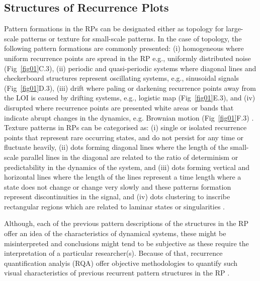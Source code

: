 \documentclass[fleqn,10pt]{wlscirep}
\begin{document}
\subsection*{Structures of Recurrence Plots}
Pattern formations in the RPs can be designated either 
as topology for large-scale patterns or texture for small-scale patterns.
In the case of topology, the following pattern formations are commonly presented:
(i) homogeneous where uniform recurrence points are spread in the RP e.g., 
uniformly distributed noise (Fig~\ref{fig01}C.3),
(ii) periodic and quasi-periodic systems where diagonal lines and 
checkerboard structures represent oscillating systems, e.g., sinusoidal 
signals (Fig~\ref{fig01}D.3),
(iii) drift where paling or darkening recurrence points away from 
the LOI is caused by drifting systems, 
e.g., logistic map (Fig~\ref{fig01}E.3), and
(iv) disrupted where recurrence points are presented white areas or 
bands that indicate abrupt changes in the dynamics, e.g. Brownian motion 
(Fig~\ref{fig01}F.3) \cite{eckmann1987, marwan2015}.
Texture patterns in RPs can be categorised as:
(i) single or isolated recurrence points that represent rare occurring states, 
and do not persist for any time or fluctuate heavily,
(ii) dots forming diagonal lines where the length of the small-scale parallel 
lines in the diagonal are related to the ratio of determinism or predictability 
in the dynamics of the system, and
(iii) dots forming vertical and horizontal lines where the length of the 
lines represent a time length where a state does not change or change very 
slowly and these patterns formation represent discontinuities in the signal, 
and (iv) dots clustering to inscribe rectangular regions which are related 
to laminar states or singularities \cite{marwan2015}.

Although, each of the previous pattern descriptions of the structures in the 
RP offer an idea of the characteristics of dynamical systems, 
these might be misinterpreted and conclusions might tend to be subjective 
as these require the interpretation of a particular researcher(s).
Because of that, recurrence quantification analyis (RQA) offer objective 
methodologies to quantify such visual characteristics of previous 
recurrent pattern structures in the RP \cite{zbilut1992}.
\end{document}
